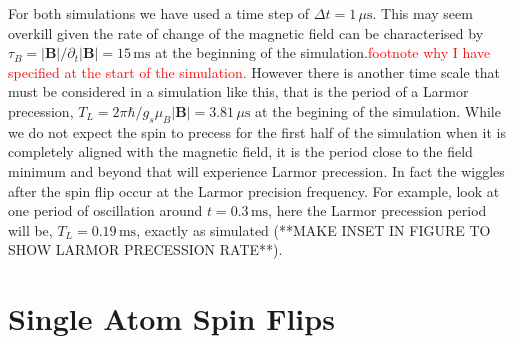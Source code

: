 For both simulations we have used a time step of $\Delta t = 1\,\mu\mathrm{s}$.
This may seem overkill given the rate of change of the magnetic field can be characterised by $\tau_B=\vert\mathbf{B}\vert / \partial_t\vert\mathbf{B}\vert = 15\,\mathrm{ms}$ at the beginning of the simulation.\textcolor{red}{footnote why I have specified at the start of the simulation.}
However there is another time scale that must be considered in a simulation like this, that is the period of a Larmor precession, $T_L = 2\pi\hbar / g_s \mu_B \vert\mathbf{B}\vert = 3.81\,\mu\mathrm{s}$ at the begining of the simulation.
While we do not expect the spin to precess for the first half of the simulation when it is completely aligned with the magnetic field, it is the period close to the field minimum and beyond that will experience Larmor precession.
In fact the wiggles after the spin flip occur at the Larmor precision frequency.
For example, look at one period of oscillation around $t=0.3\,\mathrm{ms}$, here the Larmor precession period will be, $T_L=0.19\,\mathrm{ms}$, exactly as simulated (**MAKE INSET IN FIGURE TO SHOW LARMOR PRECESSION RATE**).



\section{Single Atom Spin Flips} \label{sec:EhrenfestSingleAtom}

